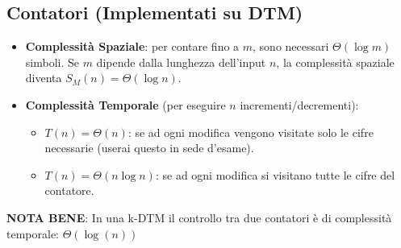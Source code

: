 \subsection{Contatori (Implementati su DTM)}
\begin{itemize}
    \item \textbf{Complessità Spaziale}: per contare fino a $m$, sono necessari $\Theta(\log m)$ simboli. Se $m$ dipende dalla lunghezza dell'input $n$, la complessità spaziale diventa $S_M(n) = \Theta(\log n)$.
    \item \textbf{Complessità Temporale} (per eseguire $n$ incrementi/decrementi):
    \begin{itemize}
        \item $T(n) = \Theta(n)$: se ad ogni modifica vengono visitate solo le cifre necessarie (userai questo in sede d'esame).
        \item $T(n) = \Theta(n \log n)$: se ad ogni modifica si visitano tutte le cifre del contatore.
    \end{itemize}
\end{itemize}

\textbf{NOTA BENE}: In una k-DTM il controllo tra due contatori è di complessità temporale: $\Theta(\log(n))$